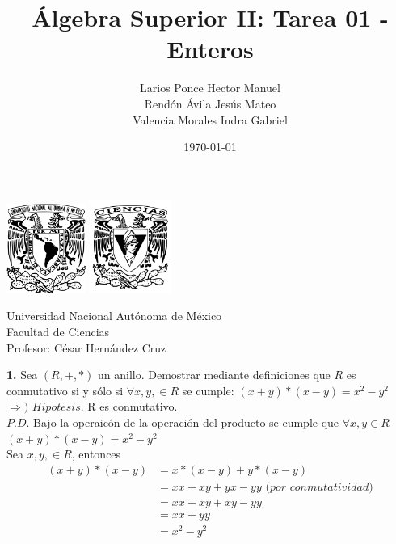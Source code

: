 \documentclass[12pt]{article}
\title{\textbf{Álgebra Superior II: Tarea 01 - Enteros}}
\author{Larios Ponce Hector Manuel\\Rendón Ávila Jesús Mateo\\Valencia Morales Indra Gabriel }
\date{\today}
\begin{document}
\maketitle
\begin{center}
\vspace{3cm}
\includegraphics[width=0.195\textwidth]{Escudo.png}
\hspace{0.5cm}
\includegraphics[width=0.2\textwidth]{logo_ciencias.png}
\end{center}
\begin{center}
    \vspace{1cm}
    Universidad Nacional Autónoma de México\\
    Facultad de Ciencias\\
    Profesor: César Hernández Cruz\\
\end{center}

\newpage

%
%
\textbf{1.} Sea $(R, +, \ast)$ un anillo. Demostrar mediante definiciones que $R$ es conmutativo si y sólo si
$\forall x, y, \in R$ se cumple: $(x + y) \ast (x - y) = x^2 - y^2$\\

$\Longrightarrow)$ $Hipotesis$. R es conmutativo.\\

$P.D$. Bajo la operaicón de la operación del producto se cumple que $\forall x, y \in R$ $(x + y) \ast (x - y) = x^2 - y^2$\\

Sea $x, y, \in R$, entonces\\

\begin{align*}
    (x + y) \ast (x - y) &= x \ast (x - y) + y \ast (x - y)\\
    &= xx -xy +yx -yy \textit{ (por conmutatividad)}\\
    &= xx -xy +xy -yy\\
    &= xx - yy\\
    &= x^2 -y^2\\
\end{align*} 
\end{document}
